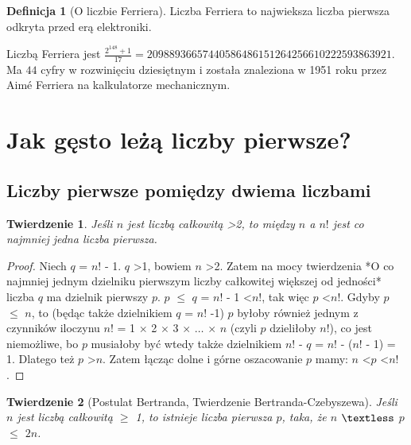 \documentclass[10pt,onecolumn]{article}
\newtheorem{theorem}{Twierdzenie}
\theoremstyle{definition}
\newtheorem{definition}{Definicja}
\theoremstyle{hypothesis}
\theoremstyle{capability}
\begin{document}
\begin{definition}[O liczbie Ferriera]
Liczba Ferriera to najwieksza liczba pierwsza odkryta przed erą elektroniki. 
\end{definition}

Liczbą Ferriera jest $\frac{2^{148} + 1}{17} = 20 988 936 657 440 586 486 151 264 256 610 222 593 863 921$. Ma $44$ cyfry w rozwinięciu dziesiętnym i została znaleziona w 1951 roku przez Aimé Ferriera na kalkulatorze mechanicznym.

\newpage


\section{Jak gęsto leżą liczby pierwsze?}

\subsection{Liczby pierwsze pomiędzy dwiema liczbami}

\begin{theorem}
Jeśli $n$ jest liczbą całkowitą \textgreater 2, to między $n$ a $n!$ jest co najmniej jedna liczba pierwsza.
\end{theorem}

\begin{proof}
Niech $q$ = $n!$ - 1. $q$ \textgreater 1, bowiem $n$ \textgreater 2. Zatem na mocy twierdzenia *O co najmniej jednym dzielniku pierwszym liczby całkowitej większej od jedności* liczba $q$ ma dzielnik pierwszy $p$. $p$ $\leq$ $q$ = $n!$ - 1 \textless $n!$, tak więc $p$ \textless $n!$. Gdyby $p$ $\leq$ $n$, to (będąc także dzielnikiem $q$ = $n!$ -1) $p$ byłoby również jednym z czynników iloczynu $n!$ = 1 $\times$ 2 $\times$ 3 $\times$ $\ldots$ $\times$ $n$ (czyli $p$ dzieliłoby $n!$), co jest niemożliwe, bo $p$ musiałoby być wtedy także dzielnikiem $n!$ - $q$ = $n!$ - ($n!$ - 1) = 1. Dlatego też $p$ \textgreater $n$. Zatem łącząc dolne i górne oszacowanie $p$ mamy: $n$ \textless $p$ \textless $n!$.
\end{proof}

\begin{theorem}[Postulat Bertranda, Twierdzenie Bertranda-Czebyszewa]
Jeśli $n$ jest liczbą całkowitą $\geq$ 1, to istnieje liczba pierwsza $p$, taka, że $n$ $\textless$ $p$ $\leq$ $2n$.
\end{theorem}
\end{document}
